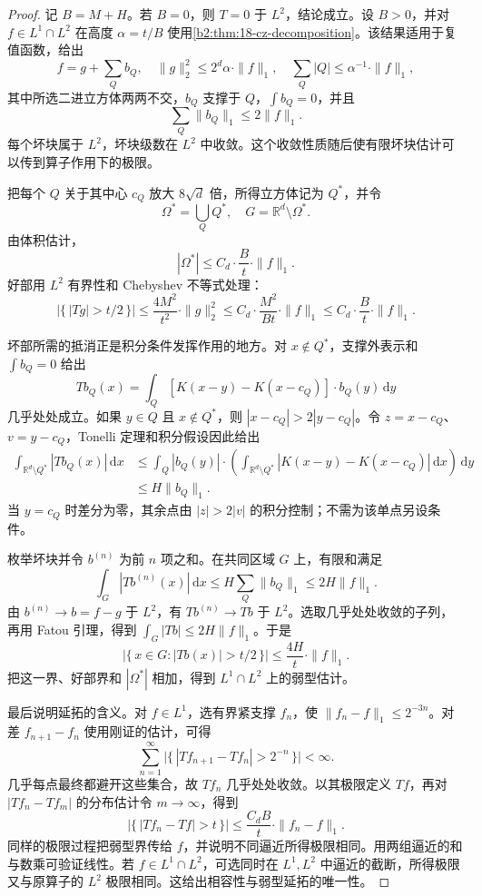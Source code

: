\begin{proof}
记 \(B=M+H\)。若 \(B=0\)，则 \(T=0\) 于 \(L^2\)，结论成立。设 \(B>0\)，并对 \(f\in L^1\cap L^2\) 在高度 \(\alpha=t/B\) 使用\cref{b2:thm:18-cz-decomposition}。该结果适用于复值函数，给出
\[
 f=g+\sum_Qb_Q,\quad
 \|g\|_2^2\leq 2^d\alpha\cdot\|f\|_1,\quad
 \sum_Q|Q|\leq\alpha^{-1}\cdot\|f\|_1,
\]
其中所选二进立方体两两不交，\(b_Q\) 支撑于 \(Q\)，\(\int b_Q=0\)，并且
\[
 \sum_Q\|b_Q\|_1\leq2\|f\|_1.
\]
每个坏块属于 \(L^2\)，坏块级数在 \(L^2\) 中收敛。这个收敛性质随后使有限坏块估计可以传到算子作用下的极限。

把每个 \(Q\) 关于其中心 \(c_Q\) 放大 \(8\sqrt d\) 倍，所得立方体记为 \(Q^*\)，并令
\[
 \Omega^*=\bigcup_QQ^*,\quad G=\mathbb R^d\setminus\Omega^*.
\]
由体积估计，
\[
 |\Omega^*|\leq C_d\cdot\frac{B}{t}\cdot\|f\|_1.
\]
好部用 \(L^2\) 有界性和 Chebyshev 不等式处理：
\[
 \bigl|\{\,|Tg|>t/2\,\}\bigr|
 \leq\frac{4M^2}{t^2}\cdot\|g\|_2^2
 \leq C_d\cdot\frac{M^2}{Bt}\cdot\|f\|_1
 \leq C_d\cdot\frac{B}{t}\cdot\|f\|_1.
\]

坏部所需的抵消正是积分条件发挥作用的地方。对 \(x\notin Q^*\)，支撑外表示和 \(\int b_Q=0\) 给出
\[
 Tb_Q(x)=\int_Q
 [K(x-y)-K(x-c_Q)]\cdot b_Q(y)\,\mathrm dy
\]
几乎处处成立。如果 \(y\in Q\) 且 \(x\notin Q^*\)，则 \(|x-c_Q|>2|y-c_Q|\)。令 \(z=x-c_Q\)、\(v=y-c_Q\)，Tonelli 定理和积分假设因此给出
\[
 \begin{aligned}
 \int_{\mathbb R^d\setminus Q^*}|Tb_Q(x)|\,\mathrm dx
 &\leq\int_Q|b_Q(y)|\cdot
   \left(\int_{\mathbb R^d\setminus Q^*}
    |K(x-y)-K(x-c_Q)|\,\mathrm dx\right)\,\mathrm dy\\
 &\leq H\|b_Q\|_1.
 \end{aligned}
\]
当 \(y=c_Q\) 时差分为零，其余点由 \(|z|>2|v|\) 的积分控制；不需为该单点另设条件。

枚举坏块并令 \(b^{(n)}\) 为前 \(n\) 项之和。在共同区域 \(G\) 上，有限和满足
\[
 \int_G|Tb^{(n)}(x)|\,\mathrm dx
 \leq H\sum_Q\|b_Q\|_1\leq2H\|f\|_1.
\]
由 \(b^{(n)}\to b=f-g\) 于 \(L^2\)，有 \(Tb^{(n)}\to Tb\) 于 \(L^2\)。选取几乎处处收敛的子列，再用 Fatou 引理，得到 \(\int_G|Tb|\leq2H\|f\|_1\)。于是
\[
 \bigl|\{\,x\in G:|Tb(x)|>t/2\,\}\bigr|
 \leq\frac{4H}{t}\cdot\|f\|_1.
\]
把这一界、好部界和 \(|\Omega^*|\) 相加，得到 \(L^1\cap L^2\) 上的弱型估计。

最后说明延拓的含义。对 \(f\in L^1\)，选有界紧支撑 \(f_n\)，使 \(\|f_n-f\|_1\leq2^{-3n}\)。对差 \(f_{n+1}-f_n\) 使用刚证的估计，可得
\[
 \sum_{n=1}^{\infty}
 \bigl|\{\,|Tf_{n+1}-Tf_n|>2^{-n}\,\}\bigr|<\infty.
\]
几乎每点最终都避开这些集合，故 \(Tf_n\) 几乎处处收敛。以其极限定义 \(Tf\)，再对 \(|Tf_n-Tf_m|\) 的分布估计令 \(m\to\infty\)，得到
\[
 \bigl|\{\,|Tf_n-Tf|>t\,\}\bigr|
 \leq\frac{C_dB}{t}\cdot\|f_n-f\|_1.
\]
同样的极限过程把弱型界传给 \(f\)，并说明不同逼近所得极限相同。用两组逼近的和与数乘可验证线性。若 \(f\in L^1\cap L^2\)，可选同时在 \(L^1,L^2\) 中逼近的截断，所得极限又与原算子的 \(L^2\) 极限相同。这给出相容性与弱型延拓的唯一性。
\end{proof}

